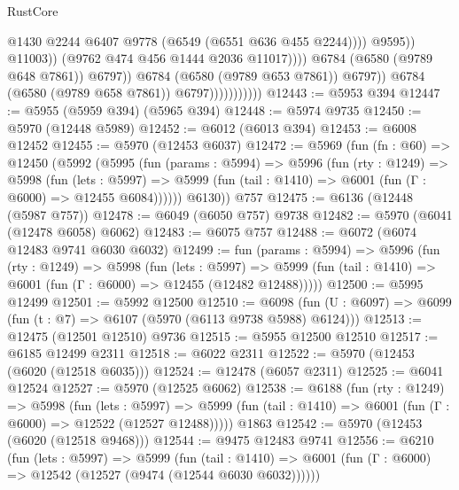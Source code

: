 \begin{lexlean}{RustCore}
\begin{coremodule}
{\begin{coremodule}
{{{{{{{{{{{{{{{{{{{{{{{{{{{{{{{{{{{{{{{{{{{{{                                                    @1430
                                                    @2244
                                                    @6407
                                                    @9778
                                                    (@6549 (@6551 @636 @455 @2244))))
                                                @9595))
                                            @11003))
                                        (@9762 @474 @456 @1444 @2036 @11017))))
                                  @6784
                                  (@6580 (@9789 @648 @7861))
                                  @6797))
                              @6784
                              (@6580 (@9789 @653 @7861))
                              @6797))
                          @6784
                          (@6580 (@9789 @658 @7861))
                          @6797)))))))))))
@12443 := @5953 @394
@12447 := @5955 (@5959 @394) (@5965 @394)
@12448 := @5974 @9735
@12450 := @5970 (@12448 @5989)
@12452 := @6012 (@6013 @394)
@12453 := @6008 @12452
@12455 := @5970 (@12453 @6037)
@12472 := @5969
    (fun (fn : @60) =>
    @12450
      (@5992
        (@5995
          (fun (params : @5994) =>
          @5996
            (fun (rty : @1249) =>
            @5998
              (fun (lets : @5997) =>
              @5999 (fun (tail : @1410) => @6001 (fun (Γ : @6000) => @12455 @6084))))))
        @6130))
    @757
@12475 := @6136 (@12448 (@5987 @757))
@12478 := @6049 (@6050 @757) @9738
@12482 := @5970 (@6041 (@12478 @6058) @6062)
@12483 := @6075 @757
@12488 := @6072 (@6074 @12483 @9741 @6030 @6032)
@12499 := fun (params : @5994) =>
  @5996
    (fun (rty : @1249) =>
    @5998
      (fun (lets : @5997) =>
      @5999 (fun (tail : @1410) => @6001 (fun (Γ : @6000) => @12455 (@12482 @12488)))))
@12500 := @5995 @12499
@12501 := @5992 @12500
@12510 := @6098 (fun (U : @6097) => @6099 (fun (t : @7) => @6107 (@5970 (@6113 @9738 @5988) @6124)))
@12513 := @12475 (@12501 @12510) @9736
@12515 := @5955 @12500 @12510
@12517 := @6185 @12499 @2311
@12518 := @6022 @2311
@12522 := @5970 (@12453 (@6020 (@12518 @6035)))
@12524 := @12478 (@6057 @2311)
@12525 := @6041 @12524
@12527 := @5970 (@12525 @6062)
@12538 := @6188
    (fun (rty : @1249) =>
    @5998
      (fun (lets : @5997) =>
      @5999 (fun (tail : @1410) => @6001 (fun (Γ : @6000) => @12522 (@12527 @12488)))))
    @1863
@12542 := @5970 (@12453 (@6020 (@12518 @9468)))
@12544 := @9475 @12483 @9741
@12556 := @6210
    (fun (lets : @5997) =>
    @5999
      (fun (tail : @1410) =>
      @6001 (fun (Γ : @6000) => @12542 (@12527 (@9474 (@12544 @6030 @6032))))))
}}}}}}}}}}}}}}}}}}}}}}}}}}}}}}}}}}}}}}}}}}}}}
\end{coremodule}}
\end{coremodule}
\end{lexlean}
